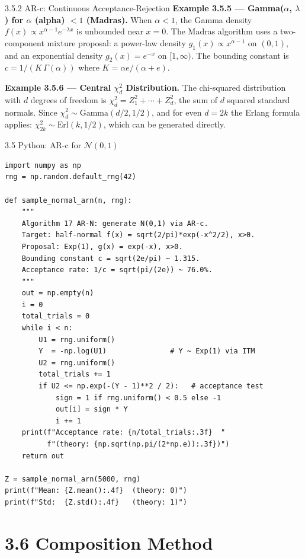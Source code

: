 \documentclass[aspectratio=169,10pt]{beamer}
\newcommand{\NN}{\mathcal{N}}
\begin{document}
\begin{frame}[allowframebreaks]{3.5.2 AR-c: Continuous Acceptance-Rejection}
\textbf{Example 3.5.5 --- Gamma($\alpha$, $\lambda$) for $\alpha$ (alpha) $< 1$ (Madras).}
When $\alpha < 1$, the Gamma density $f(x) \propto x^{\alpha-1} e^{-\lambda x}$
is unbounded near $x = 0$.  The Madras algorithm uses a two-component mixture
proposal: a power-law density $g_1(x) \propto x^{\alpha-1}$ on $(0,1)$, and an
exponential density $g_2(x) = e^{-x}$ on $[1,\infty)$.  The bounding constant
is $c = 1/(K\,\Gamma(\alpha))$ where $K = \alpha e/(\alpha + e)$.

\textbf{Example 3.5.6 --- Central $\chi^2_d$ Distribution.}
The chi-squared distribution with $d$ degrees of freedom is $\chi^2_d = Z_1^2 + \cdots + Z_d^2$,
the sum of $d$ squared standard normals.  Since $\chi^2_d \sim \mathrm{Gamma}(d/2, 1/2)$,
and for even $d = 2k$ the Erlang formula applies: $\chi^2_{2k} \sim \mathrm{Erl}(k, 1/2)$,
which can be generated directly.

\end{frame}

\begin{frame}[fragile]{3.5 Python: AR-c for $\NN(0,1)$}
\begin{lstlisting}[style=python, caption={AR-N (Algorithm 17): generate standard normal via acceptance-rejection with Exp(1) proposal}]
import numpy as np
rng = np.random.default_rng(42)

def sample_normal_arn(n, rng):
    """
    Algorithm 17 AR-N: generate N(0,1) via AR-c.
    Target: half-normal f(x) = sqrt(2/pi)*exp(-x^2/2), x>0.
    Proposal: Exp(1), g(x) = exp(-x), x>0.
    Bounding constant c = sqrt(2e/pi) ~ 1.315.
    Acceptance rate: 1/c = sqrt(pi/(2e)) ~ 76.0%.
    """
    out = np.empty(n)
    i = 0
    total_trials = 0
    while i < n:
        U1 = rng.uniform()
        Y  = -np.log(U1)               # Y ~ Exp(1) via ITM
        U2 = rng.uniform()
        total_trials += 1
        if U2 <= np.exp(-(Y - 1)**2 / 2):   # acceptance test
            sign = 1 if rng.uniform() < 0.5 else -1
            out[i] = sign * Y
            i += 1
    print(f"Acceptance rate: {n/total_trials:.3f}  "
          f"(theory: {np.sqrt(np.pi/(2*np.e)):.3f})")
    return out

Z = sample_normal_arn(5000, rng)
print(f"Mean: {Z.mean():.4f}  (theory: 0)")
print(f"Std:  {Z.std():.4f}   (theory: 1)")
\end{lstlisting}
\end{frame}

\section{3.6 Composition Method}
\end{document}
